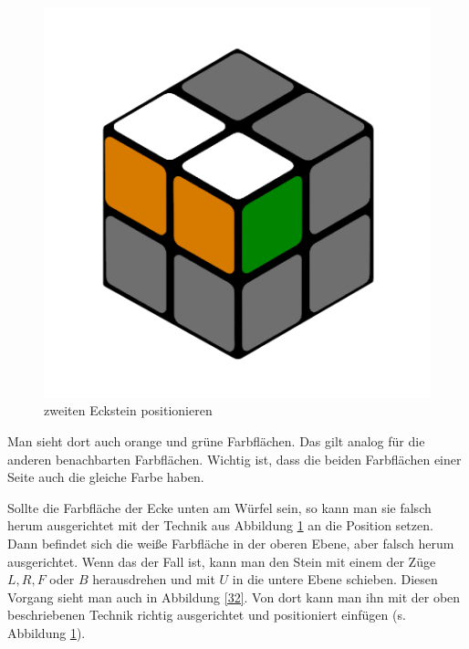 \documentclass[12pt,a4paper, usenames, dvipsnames]{article}
\theoremstyle{mystyle}
\theoremstyle{definition}
\begin{document}
\begin{figure}[H]
\includegraphics[scale=0.1]{e1_s2_s2.png}
\caption{zweiten Eckstein positionieren}
\label{31}
\end{figure}

Man sieht dort auch orange und grüne Farbflächen. Das gilt analog für die anderen benachbarten Farbflächen. Wichtig ist, dass die beiden Farbflächen einer Seite auch die gleiche Farbe haben.

Sollte die Farbfläche der Ecke unten am Würfel sein, so kann man sie falsch herum ausgerichtet mit der Technik aus Abbildung \ref{31} an die Position setzen. Dann befindet sich die weiße Farbfläche in der oberen Ebene, aber falsch herum ausgerichtet. Wenn das der Fall ist, kann man den Stein mit einem der Züge $L, R, F$ oder $B$ herausdrehen und mit $U$ in die untere Ebene schieben. Diesen Vorgang sieht man auch in Abbildung \ref{32}. Von dort kann man ihn mit der oben beschriebenen Technik richtig ausgerichtet und positioniert einfügen (s. Abbildung \ref{31}). 
\end{document}
